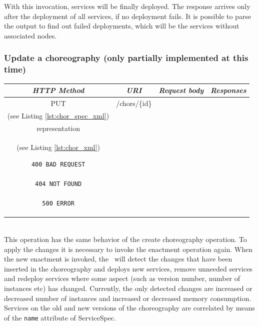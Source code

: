 With this invocation, services will be finally deployed.
The response arrives only after the deployment of all services, if no deployment fails.
It is possible to parse the output to find out failed deployments, which will be the services without associated nodes.

\subsubsection*{Update a choreography (only partially implemented at this time)}

\begin{tabular}{|c|c|c|c|}
\hline 
\itshape{HTTP Method} & \itshape{URI} & \itshape{Request body} & \itshape{Responses} \\ 
\hline 
PUT & /chors/\{id\} & 

\begin{minipage}{2in}
\verb!ChorSpec! XML representation \\ 
(see Listing \ref{lst:chor_spec_xml})
\end{minipage} 
&
\begin{minipage}{2in}
\begin{verbatim}

200 OK
location = "/chors/{id}"
Body: 
\end{verbatim}
\verb!Choreography! XML \\
representation \\
(see Listing \ref{lst:chor_xml})
\begin{verbatim}
400 BAD REQUEST

404 NOT FOUND

500 ERROR

\end{verbatim}
\end{minipage} 
\\ 
\hline 
\end{tabular} \\

This operation has the same behavior of the create choreography operation.
To apply the changes it is necessary to invoke the enactment operation again.
When the new enactment is invoked, the \ee\ will detect the changes that have
been inserted in the choreography and deploys new services, remove unneeded services and redeploy
services where some aspect (such as version number, number of instances etc) has changed.
Currently, the only detected changes are increased or decreased number of instances
and increased or decreased memory consumption. Services on the old and new versions
of the choreography are correlated by means of the \texttt{name} attribute of ServiceSpec.

